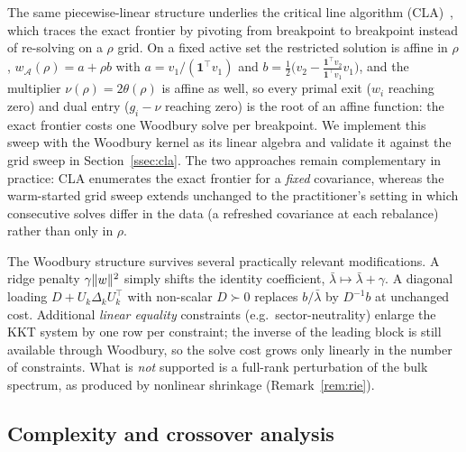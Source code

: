 \begin{remark}\label{rem:cla}
The same piecewise-linear structure underlies the critical line algorithm
(CLA)~\cite{markowitz1956,niedermayer2010,cvxcla}, which traces the exact
frontier by pivoting from breakpoint to breakpoint instead of re-solving on a
$\rho$ grid. On a fixed active set the restricted solution is affine in
$\rho$, $w_\mathcal{A}(\rho) = a + \rho b$ with
$a = v_1/(\mathbf{1}^\top v_1)$ and
$b = \tfrac12\bigl(v_2 - \tfrac{\mathbf{1}^\top v_2}{\mathbf{1}^\top v_1}v_1\bigr)$,
and the multiplier $\nu(\rho) = 2\theta(\rho)$ is affine as well, so every
primal exit ($w_i$ reaching zero) and dual entry ($g_i - \nu$ reaching zero)
is the root of an affine function: the exact frontier costs one Woodbury
solve per breakpoint. We implement this sweep with the Woodbury kernel as its
linear algebra and validate it against the grid sweep in
Section~\ref{ssec:cla}. The two approaches remain complementary in practice:
CLA enumerates the exact frontier for a \emph{fixed} covariance, whereas the
warm-started grid sweep extends unchanged to the practitioner's setting in
which consecutive solves differ in the data (a refreshed covariance at each
rebalance) rather than only in $\rho$.
\end{remark}

\begin{remark}\label{rem:ridge}
The Woodbury structure survives several practically relevant modifications.
A ridge penalty $\gamma\lVert w \rVert^2$ simply shifts the identity coefficient,
$\bar\lambda \mapsto \bar\lambda + \gamma$. A diagonal loading
$D + U_k\Delta_kU_k^\top$ with non-scalar $D \succ 0$ replaces $b/\bar\lambda$
by $D^{-1}b$ at unchanged cost. Additional \emph{linear equality} constraints
(e.g.\ sector-neutrality) enlarge the KKT system by one row per constraint;
the inverse of the leading block is still available through Woodbury, so the
solve cost grows only linearly in the number of constraints. What is
\emph{not} supported is a full-rank perturbation of the bulk spectrum, as
produced by nonlinear shrinkage (Remark~\ref{rem:rie}).
\end{remark}

\subsection{Complexity and crossover analysis}

